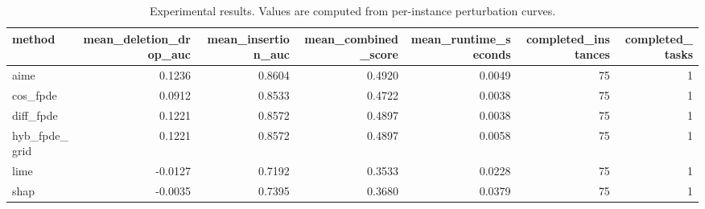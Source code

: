 \begin{table}[t]
\caption{Experimental results. Values are computed from per-instance perturbation curves.}
\label{tab:main_results_computed}
\centering
\begin{tabular}{lrrrrrr}
\toprule
method & mean\_deletion\_drop\_auc & mean\_insertion\_auc & mean\_combined\_score & mean\_runtime\_seconds & completed\_instances & completed\_tasks \\
\midrule
aime & 0.1236 & 0.8604 & 0.4920 & 0.0049 & 75 & 1 \\
cos\_fpde & 0.0912 & 0.8533 & 0.4722 & 0.0038 & 75 & 1 \\
diff\_fpde & 0.1221 & 0.8572 & 0.4897 & 0.0038 & 75 & 1 \\
hyb\_fpde\_grid & 0.1221 & 0.8572 & 0.4897 & 0.0058 & 75 & 1 \\
lime & -0.0127 & 0.7192 & 0.3533 & 0.0228 & 75 & 1 \\
shap & -0.0035 & 0.7395 & 0.3680 & 0.0379 & 75 & 1 \\
\bottomrule
\end{tabular}

\end{table}
